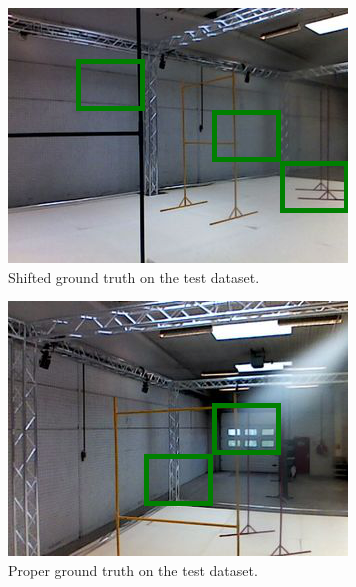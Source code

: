 \begin{figure}[h]
	\centering
	\begin{subfigure}{0.49\textwidth}
		\includegraphics[width=\textwidth]{figure/shifted_gt.png}
		\caption{Shifted ground truth on the test dataset.}
		\label{fig:bad-gt}
	\end{subfigure}
	\begin{subfigure}{0.49\textwidth}
		\includegraphics[width=\textwidth]{figure/good_gt.png}
		\caption{Proper ground truth on the test dataset.}
		\label{fig:good-gt}
	\end{subfigure}
	\caption[Shifted and proper ground truth projection]{}
\end{figure}

